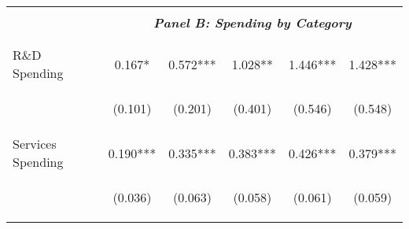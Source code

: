 \begin{tabular}{lccccc}
    \cmidrule{2-6}
    \vspace{-1.5pt} & \vspace{-1.5pt} & \vspace{-1.5pt} & \vspace{-1.5pt} & \vspace{-1.5pt} \\
    & \multicolumn{5}{c}{\textit{\textbf{Panel B: Spending by Category}}} \\ 
    \vspace{-1.5pt} & \vspace{-1.5pt} & \vspace{-1.5pt} & \vspace{-1.5pt} & \vspace{-1.5pt} \\ 
    \cmidrule{2-6}
    \vspace{-1.5pt} & \vspace{-1.5pt} & \vspace{-1.5pt} & \vspace{-1.5pt} & \vspace{-1.5pt} \\
    R\&D Spending & 0.167* & 0.572*** & 1.028** & 1.446*** & 1.428*** \\
    \vspace{4pt} & \begin{footnotesize}(0.101)\end{footnotesize} & \begin{footnotesize}(0.201)\end{footnotesize} & \begin{footnotesize}(0.401)\end{footnotesize} & \begin{footnotesize}(0.546)\end{footnotesize} & \begin{footnotesize}(0.548)\end{footnotesize} \\
    Services Spending & 0.190*** & 0.335*** & 0.383*** & 0.426*** & 0.379*** \\
    \vspace{4pt} & \begin{footnotesize}(0.036)\end{footnotesize} & \begin{footnotesize}(0.063)\end{footnotesize} & \begin{footnotesize}(0.058)\end{footnotesize} & \begin{footnotesize}(0.061)\end{footnotesize} & \begin{footnotesize}(0.059)\end{footnotesize} \\

\end{tabular}
